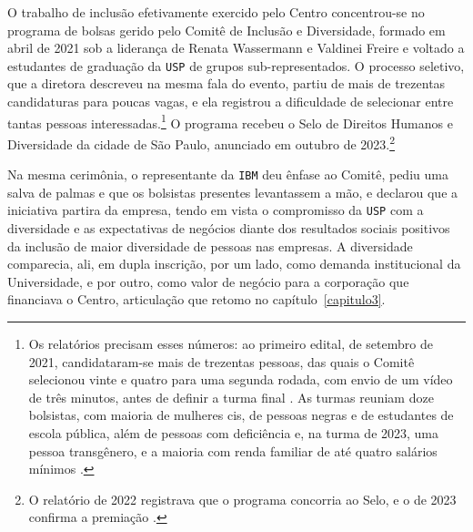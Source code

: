 O trabalho de inclusão efetivamente exercido pelo Centro concentrou-se no programa de bolsas gerido pelo Comitê de Inclusão e Diversidade, formado em abril de 2021 sob a liderança de Renata Wassermann e Valdinei Freire e voltado a estudantes de graduação da \texttt{USP} de grupos sub-representados. O processo seletivo, que a diretora descreveu na mesma fala do evento, partiu de mais de trezentas candidaturas para poucas vagas, e ela registrou a dificuldade de selecionar entre tantas pessoas interessadas.\footnote{Os relatórios precisam esses números: ao primeiro edital, de setembro de 2021, candidataram-se mais de trezentas pessoas, das quais o Comitê selecionou vinte e quatro para uma segunda rodada, com envio de um vídeo de três minutos, antes de definir a turma final \parencite{C4AI2022}. As turmas reuniam doze bolsistas, com maioria de mulheres cis, de pessoas negras e de estudantes de escola pública, além de pessoas com deficiência e, na turma de 2023, uma pessoa transgênero, e a maioria com renda familiar de até quatro salários mínimos \parencite{C4AI2022, C4AI2023}.} O programa recebeu o Selo de Direitos Humanos e Diversidade da cidade de São Paulo, anunciado em outubro de 2023.\footnote{O relatório de 2022 registrava que o programa concorria ao Selo, e o de 2023 confirma a premiação \parencite{C4AI2022, C4AI2023}.}

Na mesma cerimônia, o representante da \texttt{IBM} deu ênfase ao Comitê, pediu uma salva de palmas e que os bolsistas presentes levantassem a mão, e declarou que a iniciativa partira da empresa, tendo em vista o compromisso da \texttt{USP} com a diversidade e as expectativas de negócios diante dos resultados sociais positivos da inclusão de maior diversidade de pessoas nas empresas. A diversidade comparecia, ali, em dupla inscrição, por um lado, como demanda institucional da Universidade, e por outro, como valor de negócio para a corporação que financiava o Centro, articulação que retomo no capítulo~\ref{capitulo3}.

